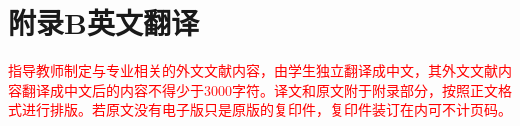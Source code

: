 

\chapter{附录B\quad 英文翻译}

\textcolor{red}{指导教师制定与专业相关的外文文献内容，由学生独立翻译成中文，其外文文献内容翻译成中文后的内容不得少于3000字符。译文和原文附于附录部分，按照正文格式进行排版。若原文没有电子版只是原版的复印件，复印件装订在内可不计页码。}